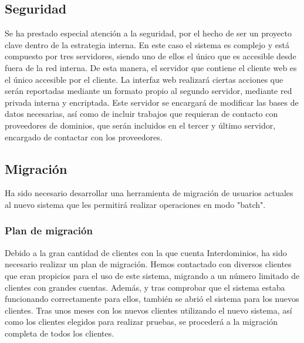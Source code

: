 \documentclass[12pt]{article}
\begin{document}
    \subsection{Seguridad}
      Se ha prestado especial atención a la seguridad, por el hecho de ser un proyecto clave dentro
      de la estrategia interna. En este caso el sistema es complejo y está compuesto por tres
      servidores, siendo uno de ellos el único que es accesible desde fuera de la red interna.
      De esta manera, el servidor que contiene el cliente web es el único accesible por el cliente.
      La interfaz web realizará ciertas acciones que serán reportadas mediante un formato propio al
      segundo servidor, mediante red privada interna y encriptada. Este servidor se encargará de
      modificar las bases de datos necesarias, así como de incluir trabajos que requieran de contacto
      con proveedores de dominios, que serán incluidos en el tercer y último servidor, encargado
      de contactar con los proveedores.
    \subsection{Migración}
      Ha sido necesario desarrollar una herramienta de migración de usuarios actuales al nuevo
      sistema que les permitirá realizar operaciones en modo "batch".
      \subsubsection{Plan de migración}
        Debido a la gran cantidad de clientes con la que cuenta Interdominios, ha sido necesario
        realizar un plan de migración. Hemos contactado con diversos clientes que eran propicios para
        el uso de este sistema, migrando a un número limitado de clientes con grandes cuentas. Además,
        y tras comprobar que el sistema estaba funcionando correctamente para ellos, también se abrió
        el sistema para los nuevos clientes. Tras unos meses con los nuevos clientes utilizando el
        nuevo sistema, así como los clientes elegidos para realizar pruebas, se procederá a la migración
        completa de todos los clientes.
  \newpage
\end{document}
